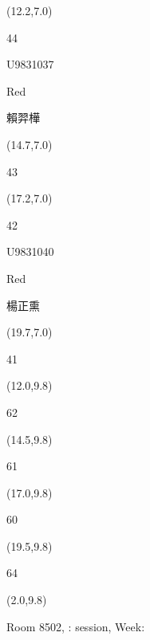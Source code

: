 \documentclass[a4paper]{article}
\newcommand{\myseat}[5]{%
\vspace{-0.1cm} \hspace{-0.5cm}
\parbox[t][2.2cm][t]{3.5cm}{%
\small #1 %
\begin{description}
\vspace{-0.1cm}
\item [ID:] #2
\vspace{-0.1cm}
\item [Team:] #3 \normalsize
\vspace{-0.1cm}
\item \normalsize #4 #5
\vspace{-0.1cm}
\end{description}
}
}
\begin{document}
\begin{CJK}{UTF8}{cyberbit}
\begin{textblock}{2.5}(12.2,7.0)
\myseat{44}{U9831037}{Red}{賴羿樺}{}
\end{textblock}

\begin{textblock}{2.5}(14.7,7.0)
\textblockcolor{}
\myseat{43}{}{}{}{}
\end{textblock}

\begin{textblock}{2.5}(17.2,7.0)
\myseat{42}{U9831040}{Red}{楊正熏}{}
\end{textblock}

\begin{textblock}{2.5}(19.7,7.0)
\textblockcolor{}
\myseat{41}{}{}{}{}
\end{textblock}




\begin{textblock}{2.5}(12.0,9.8)
\textblockcolor{}
\myseat{62}{}{}{}{}
\end{textblock}

\begin{textblock}{2.5}(14.5,9.8)
\textblockcolor{}
\myseat{61}{}{}{}{}
\end{textblock}

\begin{textblock}{2.5}(17.0,9.8)
\textblockcolor{}
\myseat{60}{}{}{}{}
\end{textblock}

\begin{textblock}{2.5}(19.5,9.8)
\textblockcolor{}
\myseat{64}{}{}{}{}
\end{textblock}

\begin{textblock}{10}(2.0,9.8)
\textblockcolor{}
\parbox[t][2.2cm][t]{9.5cm}{%
\large Room 8502, :  session, Week: 
\vspace{-0.3cm} \hspace{-0.5cm}
}
\end{textblock}

\end{CJK}
\end{document}
